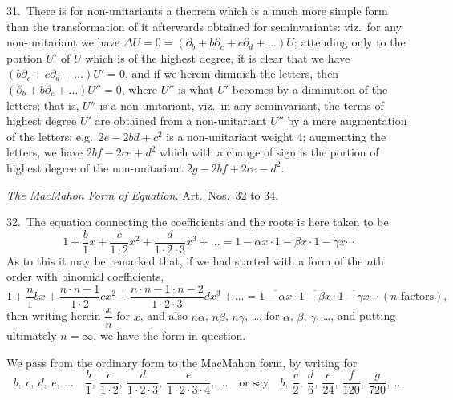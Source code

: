 \documentclass[11pt]{article}
\begin{document}
31.\ There is for non-unitariants a theorem which is a much more simple form than the transformation of it afterwards obtained for seminvariants: viz.\ for any non-unitariant we have $\Delta U = 0 = (\partial_b + b\partial_c + c\partial_d + \ldots) U$; attending only to the portion $U'$ of $U$ which is of the highest degree, it is clear that we have $(b\partial_c + c\partial_d + \ldots) U' = 0$, and if we herein diminish the letters, then $(\partial_b + b\partial_c + \ldots) U'' = 0$, where $U''$ is what $U'$ becomes by a diminution of the letters; that is, $U''$ is a non-unitariant, viz.\ in any seminvariant, the terms of highest degree $U'$ are obtained from a non-unitariant $U''$ by a mere augmentation of the letters: e.g.\ $2e - 2bd + c^2$ is a non-unitariant weight 4; augmenting the letters, we have $2bf - 2ce + d^2$ which with a change of sign is the portion of highest degree of the non-unitariant $2g - 2bf + 2ce - d^2$.

\begin{center}
\textit{The MacMahon Form of Equation.} Art.\ Nos.\ 32 to 34.
\end{center}

32.\ The equation connecting the coefficients and the roots is here taken to be
\[
1 + \frac{b}{1}x + \frac{c}{1\cdot 2}x^2 + \frac{d}{1\cdot 2\cdot 3}x^3 + \ldots = \overline{1 - \alpha x}\cdot\overline{1 - \beta x}\cdot\overline{1 - \gamma x}\cdots
\]
As to this it may be remarked that, if we had started with a form of the $n$th order with binomial coefficients,
\[
1 + \frac{n}{1}bx + \frac{n\cdot n-1}{1\cdot 2}cx^2 + \frac{n\cdot n-1\cdot n-2}{1\cdot 2\cdot 3}dx^3 + \ldots = \overline{1 - \alpha x}\cdot\overline{1 - \beta x}\cdot\overline{1 - \gamma x}\cdots\ (n \text{ factors}),
\]
then writing herein $\dfrac{x}{n}$ for $x$, and also $n\alpha$, $n\beta$, $n\gamma$, \ldots, for $\alpha$, $\beta$, $\gamma$, \ldots, and putting ultimately $n = \infty$, we have the form in question.

We pass from the ordinary form to the MacMahon form, by writing for
\[
b,\ c,\ d,\ e,\ \ldots\quad \frac{b}{1},\ \frac{c}{1\cdot 2},\ \frac{d}{1\cdot 2\cdot 3},\ \frac{e}{1\cdot 2\cdot 3\cdot 4},\ \ldots\quad\text{or say}\quad b,\ \frac{c}{2},\ \frac{d}{6},\ \frac{e}{24},\ \frac{f}{120},\ \frac{g}{720},\ \ldots
\]
\end{document}
